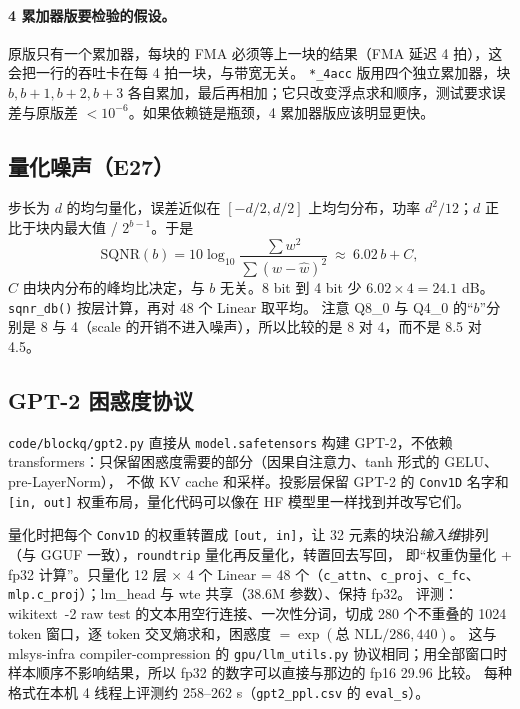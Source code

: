 \documentclass[11pt,a4paper]{ctexart}
\begin{document}
\paragraph{4 累加器版要检验的假设。}原版只有一个累加器，每块的 FMA 必须等上一块的结果（FMA 延迟 4 拍），这会把一行的吞吐卡在每 4 拍一块，与带宽无关。
\texttt{*\_4acc} 版用四个独立累加器，块 $b, b+1, b+2, b+3$ 各自累加，最后再相加；它只改变浮点求和顺序，测试要求误差与原版差 $< 10^{-6}$。如果依赖链是瓶颈，4 累加器版应该明显更快。

\subsection{量化噪声（E27）}\label{sec:noise}

步长为 $d$ 的均匀量化，误差近似在 $[-d/2, d/2]$ 上均匀分布，功率 $d^2/12$；$d$ 正比于块内最大值 / $2^{b-1}$。于是
\begin{equation}
\text{SQNR}(b) = 10\log_{10}\frac{\sum w^2}{\sum (w - \hat w)^2} \ \approx\ 6.02\,b + C ,
\label{eq:sqnr}
\end{equation}
$C$ 由块内分布的峰均比决定，与 $b$ 无关。8 bit 到 4 bit 少 $6.02 \times 4 = 24.1$ dB。\texttt{sqnr\_db()} 按层计算，再对 48 个 Linear 取平均。
注意 Q8\_0 与 Q4\_0 的“$b$”分别是 8 与 4（scale 的开销不进入噪声），所以比较的是 8 对 4，而不是 8.5 对 4.5。

\subsection{GPT-2 困惑度协议}\label{sec:pplprotocol}

\texttt{code/blockq/gpt2.py} 直接从 \texttt{model.safetensors} 构建 GPT-2，不依赖 transformers：只保留困惑度需要的部分（因果自注意力、tanh 形式的 GELU、pre-LayerNorm），
不做 KV cache 和采样。投影层保留 GPT-2 的 \texttt{Conv1D} 名字和 \texttt{[in, out]} 权重布局，量化代码可以像在 HF 模型里一样找到并改写它们。

量化时把每个 \texttt{Conv1D} 的权重转置成 \texttt{[out, in]}，让 32 元素的块沿\emph{输入维}排列（与 GGUF 一致），\texttt{roundtrip} 量化再反量化，转置回去写回，
即“权重伪量化 + fp32 计算”。只量化 12 层 × 4 个 Linear = 48 个（\texttt{c\_attn}、\texttt{c\_proj}、\texttt{c\_fc}、\texttt{mlp.c\_proj}）；lm\_head 与 wte 共享（38.6M 参数）、保持 fp32。
评测：wikitext~\cite{wikitext}-2 raw test 的文本用空行连接、一次性分词，切成 280 个不重叠的 1024 token 窗口，逐 token 交叉熵求和，困惑度 $= \exp(\text{总 NLL} / 286{,}440)$。
这与 mlsys-infra compiler-compression 的 \texttt{gpu/llm\_utils.py} 协议相同；用全部窗口时样本顺序不影响结果，所以 fp32 的数字可以直接与那边的 fp16 29.96 比较。
每种格式在本机 4 线程上评测约 258--262 s（\texttt{gpt2\_ppl.csv} 的 \texttt{eval\_s}）。
\end{document}
